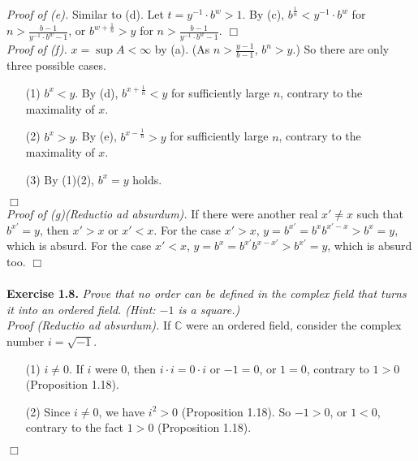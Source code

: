 \documentclass{article}
\begin{document}
\emph{Proof of (e).}
Similar to (d).
Let $t = y^{-1} \cdot b^{w} > 1$.
By (c), $b^{\frac{1}{n}} < y^{-1} \cdot b^{w}$ for $n > \frac{b-1}{y^{-1}\cdot b^{w}-1}$,
or $b^{w + \frac{1}{n}} > y$ for $n > \frac{b-1}{y^{-1}\cdot b^{w}-1}$.
$\Box$ \\

\emph{Proof of (f).}
$x = \sup A < \infty$ by (a).
(As $n > \frac{y-1}{b-1}$, $b^n > y$.)
So there are only three possible cases.
\begin{enumerate}
\item[(1)]
$b^x < y$. By (d), $b^{x + \frac{1}{n}} < y$ for sufficiently large $n$,
contrary to the maximality of $x$.
\item[(2)]
$b^x > y$. By (e), $b^{x - \frac{1}{n}} > y$ for sufficiently large $n$,
contrary to the maximality of $x$.
\item[(3)]
By (1)(2), $b^x = y$ holds.
\end{enumerate}
$\Box$ \\

\emph{Proof of (g)(Reductio ad absurdum).}
If there were another real $x' \neq x$ such that $b^{x'} = y$,
then $x' > x$ or $x' < x$.
For the case $x' > x$, $y = b^{x'} = b^{x}b^{x'-x} > b^{x} = y$,
which is absurd.
For the case $x' < x$, $y = b^{x} = b^{x'}b^{x-x'} > b^{x'} = y$,
which is absurd too.
$\Box$ \\\\






\textbf{Exercise 1.8.}
\emph{Prove that no order can be defined in the complex field that turns it
into an ordered field.
(Hint: $-1$ is a square.)} \\

\emph{Proof (Reductio ad absurdum).}
If $\mathbb{C}$ were an ordered field, consider the complex number $i = \sqrt{-1}$.

\begin{enumerate}
\item[(1)]
$i \neq 0$.
If $i$ were $0$, then $i \cdot i = 0 \cdot i$ or $-1 = 0$,
or $1 = 0$, contrary to $1 > 0$ (Proposition 1.18).
\item[(2)]
Since $i \neq 0$, we have $i^2 > 0$ (Proposition 1.18).
So $-1 > 0$, or $1 < 0$, contrary to the fact $1 > 0$ (Proposition 1.18).
\end{enumerate}
$\Box$ \\
\end{document}
